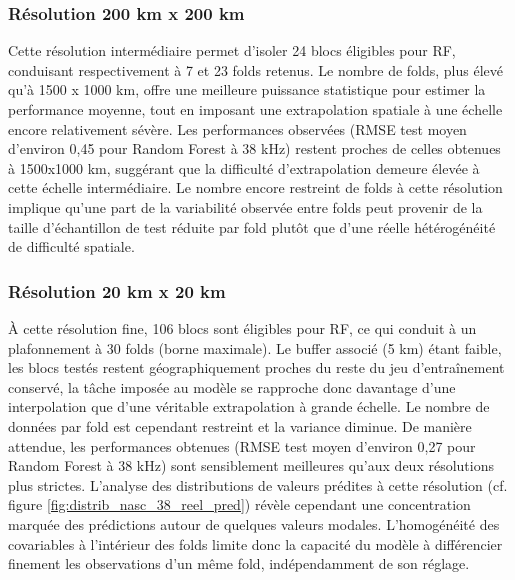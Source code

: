 \subsubsection{Résolution 200 km x 200 km}
Cette résolution intermédiaire permet d'isoler 24 blocs éligibles pour RF, conduisant respectivement à 7 et 23 folds retenus. Le nombre de folds, plus élevé qu'à 1500 x 1000 km, offre une meilleure puissance statistique pour estimer la performance moyenne, tout en imposant une extrapolation spatiale à une échelle encore relativement sévère.
Les performances observées (RMSE test moyen d'environ 0,45 pour Random Forest à 38 kHz) restent proches de celles obtenues à 1500x1000 km, suggérant que la difficulté d'extrapolation demeure élevée à cette échelle intermédiaire. Le nombre encore restreint de folds à cette résolution implique qu'une part de la variabilité observée entre folds peut provenir de la taille d'échantillon de test réduite par fold plutôt que d'une réelle hétérogénéité de difficulté spatiale.

\subsubsection{Résolution 20 km x 20 km}
À cette résolution fine, 106 blocs sont éligibles pour RF, ce qui conduit à un plafonnement à 30 folds (borne maximale). Le buffer associé (5 km) étant faible, les blocs testés restent géographiquement proches du reste du jeu d'entraînement conservé, la tâche imposée au modèle se rapproche donc davantage d'une interpolation que d'une véritable extrapolation à grande échelle. Le nombre de données par fold est cependant restreint et la variance diminue. De manière attendue, les performances obtenues (RMSE test moyen d'environ 0,27 pour Random Forest à 38 kHz) sont sensiblement meilleures qu'aux deux résolutions plus strictes. L'analyse des distributions de valeurs prédites à cette résolution (cf. figure \ref{fig:distrib_nasc_38_reel_pred}) révèle cependant une concentration marquée des prédictions autour de quelques valeurs modales. L'homogénéité des covariables à l'intérieur des folds limite donc la capacité du modèle à différencier finement les observations d'un même fold, indépendamment de son réglage. 

